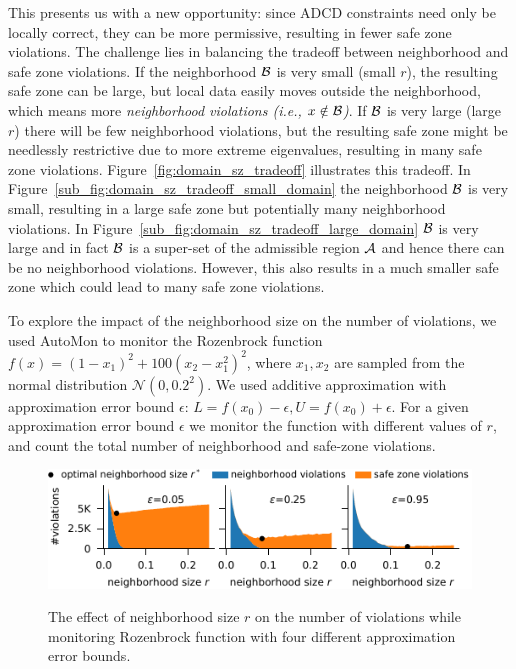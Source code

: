 This presents us with a new opportunity: since ADCD constraints need only be locally correct, they can be more permissive, resulting in fewer safe zone violations.
The challenge lies in balancing the tradeoff between neighborhood and safe zone violations.
%
If the neighborhood $\mathcal{B}$ is very small (small $r$), the resulting safe zone can be large, but local data easily moves outside the neighborhood, which means more \emph{neighborhood violations (i.e., $x \notin \mathcal{B}$)}.
If $\mathcal{B}$ is very large (large $r$) there will be few neighborhood violations, but the resulting safe zone might be needlessly restrictive due to more extreme eigenvalues, resulting in many safe zone violations.
%
Figure~\ref{fig:domain_sz_tradeoff} illustrates this tradeoff.
In Figure~\ref{sub_fig:domain_sz_tradeoff_small_domain} the neighborhood $\mathcal{B}$ is very small, resulting in a large safe zone but potentially many neighborhood violations.
In Figure~\ref{sub_fig:domain_sz_tradeoff_large_domain} $\mathcal{B}$ is very large and in fact $\mathcal{B}$ is a super-set of the admissible region $\mathcal{A}$ and hence there can be no neighborhood violations.
However, this also results in a much smaller safe zone which could lead to many safe zone violations.




To explore the impact of the neighborhood size on the number of violations, we used AutoMon to monitor the Rozenbrock function $f(x) = (1 - x_1)^2 + 100 \left(x_2 - x_1^2\right)^2$, where $x_1,x_2$ are sampled from the normal distribution $\mathcal{N}(0, 0.2^2)$.
We used additive approximation with approximation error bound $\epsilon$: $L = f(x_0) - \epsilon, U = f(x_0) + \epsilon$.
For a given approximation error bound $\epsilon$ we monitor the function with different values of $r$, and count the total number of neighborhood and safe-zone violations.

\begin{figure}
	\centering
	{\includegraphics[width=1.0\columnwidth]{figures/impact_of_neighborhood_on_violations_three_error_bounds.pdf}}
	\caption{
	    The effect of neighborhood size $r$ on the number of violations while monitoring Rozenbrock function with four different approximation error bounds.
	}
	\label{fig:impact_of_neighborhood_on_violations_three_error_bounds}
\end{figure}


